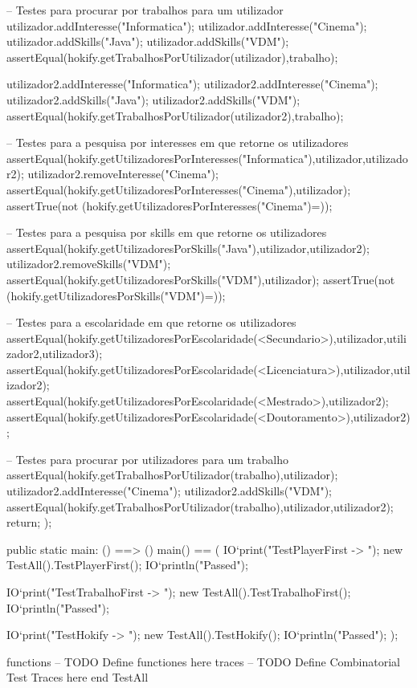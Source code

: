 \begin{vdmpp}[breaklines=true]
 -- Testes para procurar por trabalhos para um utilizador
 utilizador.addInteresse("Informatica");
 utilizador.addInteresse("Cinema");
 utilizador.addSkills("Java");
 utilizador.addSkills("VDM");
 assertEqual(hokify.getTrabalhosPorUtilizador(utilizador),{trabalho});
 
 utilizador2.addInteresse("Informatica");
 utilizador2.addInteresse("Cinema");
 utilizador2.addSkills("Java");
 utilizador2.addSkills("VDM");
 assertEqual(hokify.getTrabalhosPorUtilizador(utilizador2),{trabalho});
 
 -- Testes para a pesquisa por interesses em que retorne os utilizadores
 assertEqual(hokify.getUtilizadoresPorInteresses("Informatica"),{utilizador,utilizador2});
 utilizador2.removeInteresse("Cinema");
 assertEqual(hokify.getUtilizadoresPorInteresses("Cinema"),{utilizador});
 assertTrue(not (hokify.getUtilizadoresPorInteresses("Cinema")={}));
 
 -- Testes para a pesquisa por skills em que retorne os utilizadores
 assertEqual(hokify.getUtilizadoresPorSkills("Java"),{utilizador,utilizador2});
 utilizador2.removeSkills("VDM");
 assertEqual(hokify.getUtilizadoresPorSkills("VDM"),{utilizador});
 assertTrue(not (hokify.getUtilizadoresPorSkills("VDM")={}));
 
 -- Testes para a escolaridade em que retorne os utilizadores
 assertEqual(hokify.getUtilizadoresPorEscolaridade(<Secundario>),{utilizador,utilizador2,utilizador3});
 assertEqual(hokify.getUtilizadoresPorEscolaridade(<Licenciatura>),{utilizador,utilizador2});
 assertEqual(hokify.getUtilizadoresPorEscolaridade(<Mestrado>),{utilizador2});
 assertEqual(hokify.getUtilizadoresPorEscolaridade(<Doutoramento>),{utilizador2});
 
 -- Testes para procurar por utilizadores para um trabalho
 assertEqual(hokify.getTrabalhosPorUtilizador(trabalho),{utilizador});
 utilizador2.addInteresse("Cinema");
 utilizador2.addSkills("VDM");
 assertEqual(hokify.getTrabalhosPorUtilizador(trabalho),{utilizador,utilizador2});
 return;
);


public static main: () ==> ()
main() ==
(
 IO`print("TestPlayerFirst -> ");
 new TestAll().TestPlayerFirst();
 IO`println("Passed");
 
 IO`print("TestTrabalhoFirst -> ");
 new TestAll().TestTrabalhoFirst();
 IO`println("Passed");
 
 IO`print("TestHokify -> ");
 new TestAll().TestHokify();
 IO`println("Passed");
);

functions
-- TODO Define functiones here
traces
-- TODO Define Combinatorial Test Traces here
end TestAll
\end{vdmpp}
